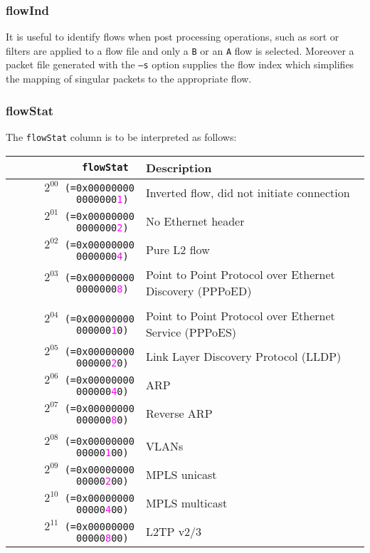 \documentclass[documentation]{subfiles}
\begin{document}
\subsubsection{flowInd}\label{flowInd}
It is useful to identify flows when post processing operations, such as sort or
filters are applied to a flow file and only a {\tt B} or an {\tt A} flow is selected. Moreover a packet
file generated with the {\tt --s} option supplies the flow index which simplifies the mapping of singular
packets to the appropriate flow.

\subsubsection{flowStat}\label{flowStat}
The {\tt flowStat} column is to be interpreted as follows:
\begin{longtable}{>{\tt}rl}
    \toprule
    {\bf flowStat}                                       & {\bf Description}\\
    \midrule\endhead%
    $2^{00}$ (=0x00000000 0000000\textcolor{magenta}{1}) & Inverted flow, did not initiate connection\\
    $2^{01}$ (=0x00000000 0000000\textcolor{magenta}{2}) & No Ethernet header\\
    $2^{02}$ (=0x00000000 0000000\textcolor{magenta}{4}) & Pure L2 flow\\
    $2^{03}$ (=0x00000000 0000000\textcolor{magenta}{8}) & Point to Point Protocol over Ethernet Discovery (PPPoED)\\
    \\
    $2^{04}$ (=0x00000000 000000\textcolor{magenta}{1}0) & Point to Point Protocol over Ethernet Service (PPPoES)\\
    $2^{05}$ (=0x00000000 000000\textcolor{magenta}{2}0) & Link Layer Discovery Protocol (LLDP)\\
    $2^{06}$ (=0x00000000 000000\textcolor{magenta}{4}0) & ARP\\
    $2^{07}$ (=0x00000000 000000\textcolor{magenta}{8}0) & Reverse ARP\\
    \\
    $2^{08}$ (=0x00000000 00000\textcolor{magenta}{1}00) & VLANs\\
    $2^{09}$ (=0x00000000 00000\textcolor{magenta}{2}00) & MPLS unicast\\
    $2^{10}$ (=0x00000000 00000\textcolor{magenta}{4}00) & MPLS multicast\\
    $2^{11}$ (=0x00000000 00000\textcolor{magenta}{8}00) & L2TP v2/3\\

\end{longtable}
\end{document}
